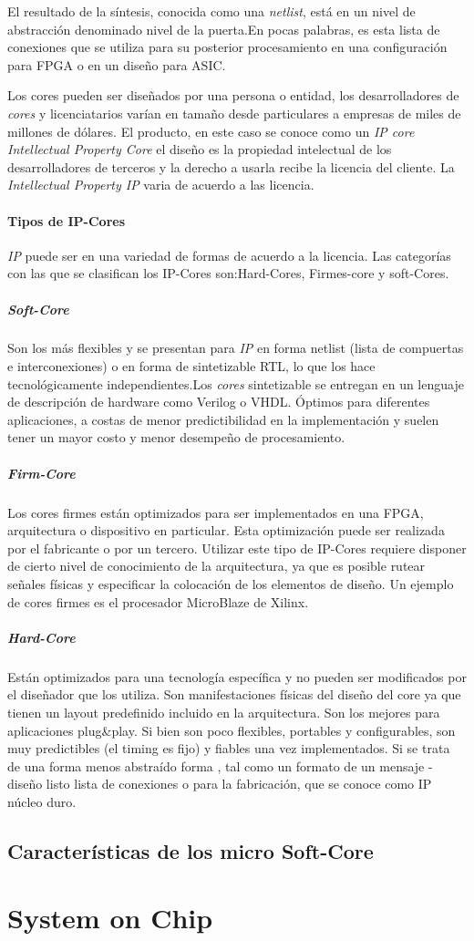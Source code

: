 El resultado de la síntesis, conocida como una \textit{netlist}, está en un nivel de abstracción denominado nivel de la puerta.En pocas palabras, es esta lista de conexiones que se utiliza para su posterior procesamiento en una configuración para FPGA o en un diseño para ASIC.

Los cores pueden ser diseñados por una persona o entidad, los desarrolladores de \textit{cores} y licenciatarios varían en tamaño desde particulares a empresas de miles de millones de dólares. El producto, en este caso se conoce como un \textit{IP core  Intellectual Property Core} el diseño es la propiedad intelectual de los desarrolladores de terceros y la derecho a usarla recibe la licencia del cliente. La \textit{Intellectual Property IP} varia  de  acuerdo a las licencia.

		\paragraph{Tipos de IP-Cores}

\textit{IP} puede ser en una variedad de formas de acuerdo a la licencia. Las categorías con las que se clasifican los IP-Cores son:Hard-Cores, Firmes-core y soft-Cores.
		
			\subparagraph{Soft-Core}

Son los más flexibles y se presentan para \textit{IP} en forma netlist (lista de compuertas e interconexiones) o en forma de sintetizable RTL, lo que los hace tecnológicamente independientes.Los \textit{cores} sintetizable se entregan en un lenguaje de descripción de hardware como Verilog o VHDL. 
 Óptimos para diferentes aplicaciones, a costas de menor predictibilidad en la implementación y suelen tener un mayor costo y menor desempeño de procesamiento.

			\subparagraph{Firm-Core}

Los cores firmes están optimizados para ser implementados en una FPGA, arquitectura o dispositivo en particular. Esta optimización puede ser realizada por el fabricante o por un tercero. Utilizar este tipo de IP-Cores requiere disponer de cierto nivel de conocimiento de la arquitectura, ya que es posible rutear señales físicas y especificar la colocación de los elementos de diseño. Un ejemplo de cores firmes es el procesador MicroBlaze de Xilinx.\cite{Etiqueta04}

			\subparagraph{Hard-Core}

Están optimizados para una tecnología específica y no pueden ser modificados por el diseñador que los utiliza. Son manifestaciones físicas del diseño del core ya que tienen un layout predefinido incluido en la arquitectura. Son los mejores para aplicaciones plug\&play. Si bien son poco flexibles, portables y configurables, son muy predictibles (el timing es fijo) y fiables una vez implementados.
Si se trata de una forma menos abstraído forma , tal como un formato de un mensaje - diseño listo lista de conexiones o para la fabricación, que se conoce como
IP núcleo duro. \cite{Etiqueta04}

		

	\subsection{Características de los micro Soft-Core}

\section{System on Chip}
